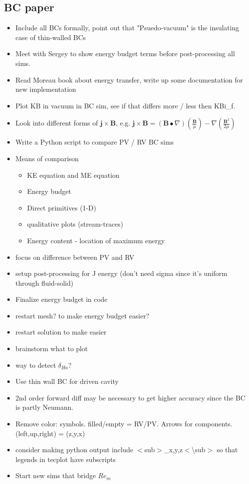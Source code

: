 \documentclass[11pt]{article}
\begin{document}
\subsection{BC paper}
\begin{itemize}
\setlength\itemsep{-1em}
\item Include all BCs formally, point out that "Psuedo-vacuum" is the insulating case of thin-walled BCs
\item Meet with Sergey to show energy budget terms before post-processing all sims.
\item Read Moreau book about energy transfer, write up some documentation for new implementation
\item Plot KB in vacuum in BC sim, see if that differs more / less then KBi\_f.
\item Look into different forms of $\mathbf{j}\times \mathbf{B}$, e.g. $\mathbf{j}\times \mathbf{B} = (\mathbf{B}\bullet\nabla) \left(\frac{\mathbf{B}}{\mu}\right) - \nabla \left( \frac{\mathbf{B}^2}{2\mu} \right)$
\item Write a Python script to compare PV / RV BC sims
\item Means of comparison
\begin{itemize}
\setlength\itemsep{-1em}
\item KE equation and ME equation
\item Energy budget
\item Direct primitives (1-D)
\item qualitative plots (stream-traces)
\item Energy content - location of maximum energy
\end{itemize}
\item focus on difference between PV and RV
\item setup post-processing for J energy (don't need sigma since it's uniform through fluid-solid)
\item Finalize energy budget in code
\item restart  mesh? to make energy budget easier?
\item restart solution to make easier
\item brainstorm what to plot
\item way to detect $\delta_{Ha}$?
\item Use thin wall BC for driven cavity
\item 2nd order forward diff may be necessary to get higher accuracy since the BC is partly Neumann.
\item Remove color: symbols. filled/empty = RV/PV. Arrows for components. (left,up,right) = (z,y,x)
\item consider making python output include $<$sub$>$\_x,y,z$<$\textbackslash sub$>$ so that legends in tecplot have subscripts
\item Start new sims that bridge $Re_m$
\end{itemize}
\end{document}
